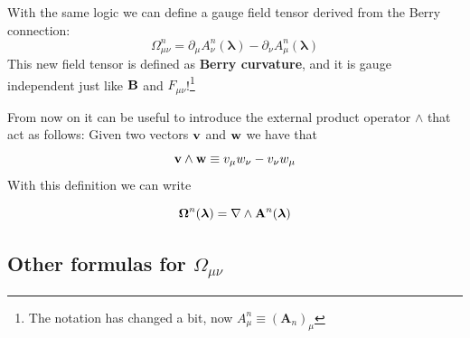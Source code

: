     With the same logic we can define a gauge field tensor derived from the Berry connection:
    \begin{equation}
        \label{eq:berry-curvature1}
        \boxed{
            \Omega_{\mu\nu}^n =\partial_\mu A^n_\nu(\boldsymbol \lambda) - \partial_\nu A^n_\mu(\boldsymbol \lambda)
        }
    \end{equation}
    This new field tensor is defined as \textbf{Berry curvature}, and it is gauge independent just like 
    $\mathbf{B}$ and $F_{\mu\nu}$!\footnote{The notation has changed a bit, now $A_\mu^n\equiv (\mathbf A_n)_\mu$}

    From now on it can be useful to introduce the external product operator $\wedge$ that act as follows:
    Given two vectors $\mathbf{v}$ and $\mathbf{w}$ we have that
    \begin{equation}
        \mathbf{v}\wedge \mathbf{w}\equiv v_\mu w_\nu-v_\nu w_\mu
    \end{equation}
    With this definition we can write

    \begin{equation}
        \boldsymbol \Omega^n(\boldsymbol \lambda)=\nabla \wedge \mathbf{A}^n(\boldsymbol \lambda)
    \end{equation}

    \subsection{Other formulas for $\Omega_{\mu\nu}$}

